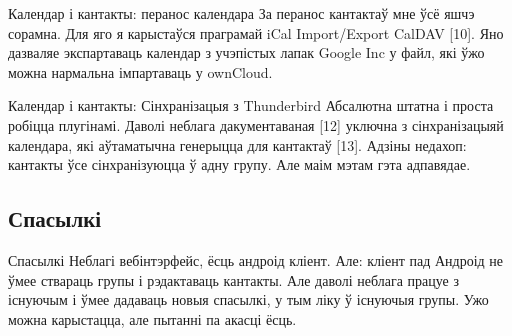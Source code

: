 \documentclass[ignorenonframetext,hyperref={pdftex,unicode}]{beamer}
\begin{document}
\begin{frame}{Календар і кантакты: перанос календара}
	За перанос кантактаў мне ўсё яшчэ сорамна. Для яго я карыстаўся праграмай iCal Import/Export CalDAV [10]. Яно дазваляе экспартаваць календар з учэпістых лапак Google Inc у файл, які ўжо можна нармальна імпартаваць у ownCloud.
\end{frame}

\begin{frame}{Календар і кантакты: Сінхранізацыя з Thunderbird}
	Абсалютна штатна і проста робіцца плугінамі. Даволі неблага дакументаваная [12] уключна з сінхранізацыяй календара, які аўтаматычна генерыцца для кантактаў [13]. Адзіны недахоп: кантакты ўсе сінхранізуюцца ў адну групу. Але маім мэтам гэта адпавядае.
\end{frame}

\subsection{Спасылкі}
\begin{frame}{Спасылкі}
	Неблагі вебінтэрфейс, ёсць андроід кліент. Але: кліент пад Андроід не ўмее ствараць групы і рэдактаваць кантакты. Але даволі неблага працуе з існуючым і ўмее дадаваць новыя спасылкі, у тым ліку ў існуючыя групы. Ужо можна карыстацца, але пытанні па акасці ёсць.
\end{frame}
\end{document}
